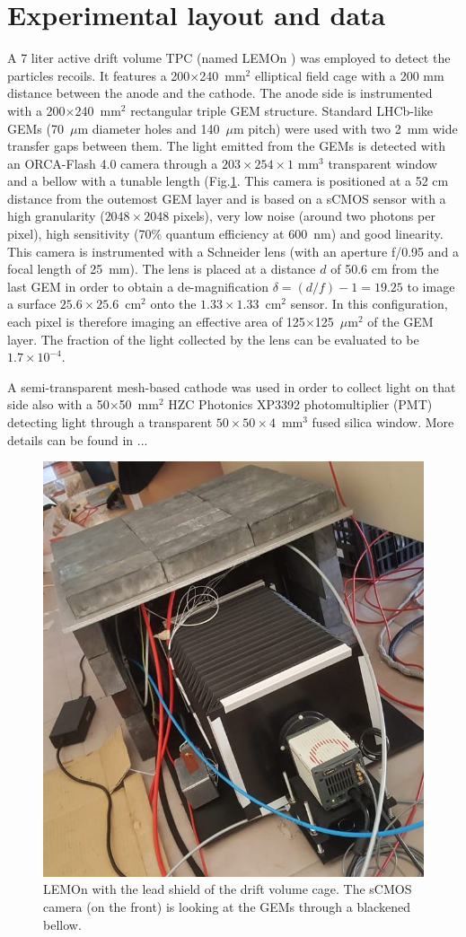\documentclass[12pt]{iopart}
\begin{document}
 \section{Experimental layout and data }
 A 7 liter active drift volume TPC  (named LEMOn  \cite{paperBTF} ) was employed to detect the particles recoils. It 
features   a  200$\times$240~mm$^2$ elliptical field cage with a 200 mm distance between the anode and the cathode. The anode side is instrumented with a 200$\times$240~mm$^2$ rectangular triple  GEM structure.
Standard LHCb-like \cite{bib:thesis} GEMs  (70~$\mu$m diameter holes and 140~$\mu$m pitch) were used with two 2~mm wide transfer gaps between them. The light emitted from the GEMs is detected with   an ORCA-Flash 4.0 camera \cite{ORCAcamera} through a  $203\times254\times1$ mm$^3$ transparent window and a  bellow with a tunable length (Fig.\ref{fig:LemonShielded}.  This camera is positioned  at a 52 cm  distance from the outemost  GEM layer and is based on a sCMOS sensor with a high granularity ($2048\times2048$ pixels), very low noise (around two photons per pixel), high sensitivity (70\%  quantum efficiency at  600~nm) and good linearity. This camera is instrumented with a Schneider lens (with an aperture f/0.95 and a focal length of 25~mm). The lens is placed at a distance $d$ of 50.6 cm from the last GEM
in order to obtain a de-magnification
$\delta = (d/f) - 1 = 19.25$ to
image a surface $25.6 \times 25.6$~cm$^2$ onto the
$1.33 \times 1.33$~cm$^2$ sensor.
In this configuration, each pixel
 is therefore imaging  an effective area of 125$\times$125~$\mu$m$^2$ of the GEM layer. The fraction of the light collected by the lens can be evaluated \cite{bib:jinst_orange1} to be $1.7 \times 10^{-4}$.

A semi-transparent mesh-based cathode was used in order to collect light on that side also with a 50$\times$50~mm$^2$ HZC Photonics XP3392 photomultiplier \cite{PMTPhotonics} (PMT) detecting light through a transparent $50\times50\times4$~mm$^3$ fused silica window. More details can be found in ...


 
\begin{figure}[ht]
	\centering
	\includegraphics[width=0.45\linewidth]{LEMON-Shielded.jpg}
  	\caption{LEMOn with the lead shield of the  drift volume cage. The sCMOS camera (on the front) is looking at the GEMs through a blackened bellow.}
  	\label{fig:LemonShielded}
\end{figure}
\end{document}
